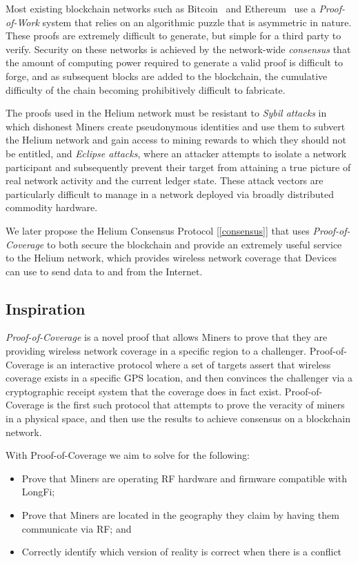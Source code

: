 \documentclass[10pt, nonatbib, nocopyrightspace, reprint]{sigplanconf}
\newcommand{\secref}[1]{[\autoref{#1}]}
\begin{document}
Most existing blockchain networks such as Bitcoin~\cite{bitcoin} and Ethereum~\cite{ethereum} use a \emph{Proof-of-Work} system that relies on an algorithmic puzzle that is asymmetric in nature. These proofs are extremely difficult to generate, but simple for a third party to verify. Security on these networks is achieved by the network-wide \emph{consensus} that the amount of computing power required to generate a valid proof is difficult to forge, and as subsequent blocks are added to the blockchain, the cumulative difficulty of the chain becoming prohibitively difficult to fabricate.

The proofs used in the Helium network must be resistant to \emph{Sybil attacks} in which dishonest Miners create pseudonymous identities and use them to subvert the Helium network and gain access to mining rewards to which they should not be entitled, and \emph{Eclipse attacks}, where an attacker attempts to isolate a network participant and subsequently prevent their target from attaining a true picture of real network activity and the current ledger state. These attack vectors are particularly difficult to manage in a network deployed via broadly distributed commodity hardware.

We later propose the Helium Consensus Protocol \secref{consensus} that uses \emph{Proof-of-Coverage} to both secure the blockchain and provide an extremely useful service to the Helium network, which provides wireless network coverage that Devices can use to send data to and from the Internet.

\subsection{Inspiration}

\emph{Proof-of-Coverage} is a novel proof that allows Miners to prove that they are providing wireless network coverage in a specific region to a challenger. Proof-of-Coverage is an interactive protocol where a set of targets assert that wireless coverage exists in a specific GPS location, and then convinces the challenger via a cryptographic receipt system that the coverage does in fact exist. Proof-of-Coverage is the first such protocol that attempts to prove the veracity of miners in a physical space, and then use the results to achieve consensus on a blockchain network.

With Proof-of-Coverage we aim to solve for the following:

\begin{itemize}
    \item Prove that Miners are operating RF hardware and firmware compatible with LongFi;
    \item Prove that Miners are located in the geography they claim by having them communicate via RF; and
    \item Correctly identify which version of reality is correct when there is a conflict
\end{itemize}
\end{document}
